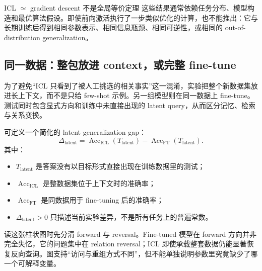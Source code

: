 

\begin{warningbox}{ICL $\simeq$ gradient descent 不是全局等价定理}
这些结果通常依赖任务分布、模型构造和最优算法假设。即使前向激活执行了一步类似优化的计算，也不能推出：它与长期训练后得到相同参数表示、相同信息瓶颈、相同可逆性，或相同的 out-of-distribution generalization。
\end{warningbox}

\subsection{同一数据：整包放进 context，或完整 fine-tune}

为了避免“ICL 只看到了被人工挑选的相关事实”这一混淆，实验把整个新数据集放进长上下文，而不是只给 few-shot 示例。另一组模型则在同一数据上 fine-tune。测试同时包含显式方向和训练中未直接出现的 latent query，从而区分记忆、检索与关系变换。


可定义一个简化的 latent generalization gap：
$$
\Delta_{\text{latent}}=
\operatorname{Acc}_{\text{ICL}}(T_{\text{latent}})
-\operatorname{Acc}_{\text{FT}}(T_{\text{latent}}).
$$
其中：
\begin{itemize}
  \item $T_{\text{latent}}$ 是答案没有以目标形式直接出现在训练数据里的测试；
  \item $\operatorname{Acc}_{\text{ICL}}$ 是整数据集位于上下文时的准确率；
  \item $\operatorname{Acc}_{\text{FT}}$ 是同数据用于 fine-tuning 后的准确率；
  \item $\Delta_{\text{latent}}>0$ 只描述当前实验差异，不是所有任务上的普遍常数。
\end{itemize}


读这张柱状图时先分清 forward 与 reversal。Fine-tuned 模型在 forward 方向并非完全失忆，它的问题集中在 relation reversal；ICL 即使承载整套数据仍能显著恢复反向查询。图支持“访问与重组方式不同”，但不能单独说明参数里究竟缺少了哪一个可解释变量。

